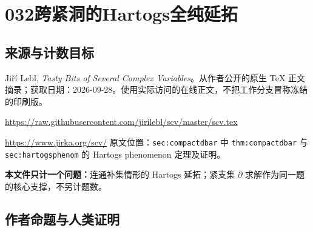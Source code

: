 \documentclass[UTF8,11pt]{ctexart}
\theoremstyle{definition}
\begin{document}
\section*{032\quad 跨紧洞的Hartogs全纯延拓}
\subsection*{来源与计数目标}
Ji\v{r}\'i Lebl, \emph{Tasty Bits of Several Complex Variables}。从作者公开的原生 TeX 正文摘录；获取日期：2026-09-28。使用实际访问的在线正文，不把工作分支冒称冻结的印刷版。
\par\url{https://raw.githubusercontent.com/jirilebl/scv/master/scv.tex}
\par\url{https://www.jirka.org/scv/}
原文位置：\texttt{sec:compactdbar} 中 \texttt{thm:compactdbar} 与 \texttt{sec:hartogsphenom} 的 Hartogs phenomenon 定理及证明。
\par\textbf{本文件只计一个问题：}连通补集情形的 Hartogs 延拓；紧支集 $\bar\partial$ 求解作为同一题的核心支撑，不另计题数。
\subsection*{作者命题与人类证明}
\end{document}
